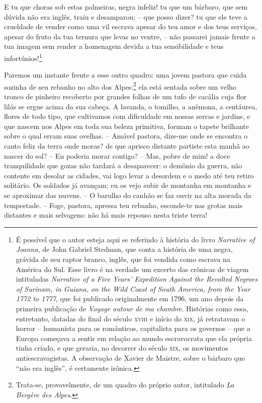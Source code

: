  E tu que choras sob estas palmeiras, negra infeliz! tu que um bárbaro,
que sem dúvida não era inglês, traiu e desamparou; -- que posso dizer?
tu que ele teve a crueldade de vender como uma vil escrava apesar do
teu amor e dos teus serviços, apesar do fruto da tua ternura que levas
no ventre, -- não passarei jamais frente a tua imagem sem render a
homenagem devida a tua sensibilidade e teus infortúnios!\footnote{ É
possível que o autor esteja aqui se referindo à história do livro
\textit{Narrative of Joanna}, de John Gabriel Stedman, que conta a
história de uma negra, grávida de seu raptor branco, inglês, que foi
vendida como escrava na América do Sul. Esse livro é na verdade um
excerto das crônicas de viagem intituladas \textit{Narrative of a Five
Years' Expedition Against the Revolted Negroes of
Surinam, in Guiana, on the Wild Coast of South America, from the Year
1772 to 1777}, que foi publicado originalmente em 1796, um ano depois
da primeira publicação de \textit{Voyage autour de ma chambre}.
Histórias como essa, entretanto, datadas do final do século \textsc{xviii} e
início do \textsc{xix}, já retratavam o horror -- humanista para os românticos,
capitalista para os governos -- que a Europa começava a sentir em
relação ao mundo escravocrata que ela própria tinha criado, e que
geraria, no decorrer do século \textsc{xix}, os movimentos antiescravagistas. A
observação de Xavier de Maistre, sobre o bárbaro que ``não era inglês'',
é certamente irônica.}

 Paremos um instante frente a esse outro quadro: uma jovem pastora que
cuida sozinha de seu rebanho no alto dos Alpes:\footnote{ Trata-se,
provavelmente, de um quadro do próprio autor, intitulado \textit{La
Bergère des Alpes}.} ela está sentada sobre um velho tronco de
pinheiro recoberto por grandes folhas de um tufo de cacália cuja flor
lilás se ergue acima da sua cabeça. A lavanda, o tomilho, a anêmona, a
centáurea, flores de todo tipo, que cultivamos com dificuldade em
nossas serras e jardins, e que nascem nos Alpes em toda sua beleza
primitiva, formam o tapete brilhante sobre o qual erram suas ovelhas.
-- Amável pastora, dize-me onde se encontra o canto feliz da terra
onde moras? de que aprisco distante partiste esta manhã ao nascer do
sol? -- Eu poderia morar contigo? -- Mas, pobre de mim! a doce
tranquilidade que gozas não tardará a desaparecer: o demônio da guerra,
não contente em desolar as cidades, vai logo levar a desordem e o medo
até teu retiro solitário. Os soldados já avançam; eu os vejo subir de
montanha em montanha e se aproximar das nuvens. -- O barulho do canhão
se faz ouvir na alta morada da tempestade. -- Foge, pastora, apressa
teu rebanho, esconde-te nas grotas mais distantes e mais selvagens: não
há mais repouso nesta triste terra!

